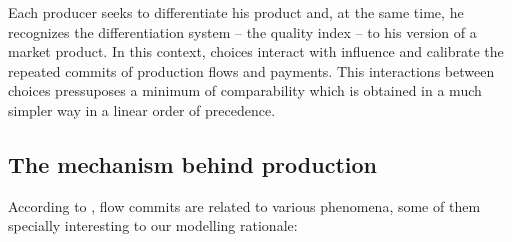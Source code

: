\documentclass[a4paper, 12pt, openright, oneside, german, french, brazil, english, article]{abntex2}
\begin{document}
	
	Each producer seeks to differentiate his product and, at the same time, he recognizes the differentiation system -- the quality index -- to his version of a market product. In this context, choices interact with influence and calibrate the repeated commits of production flows and payments. This interactions between choices pressuposes a minimum of comparability which is obtained in a much simpler way in a linear order of precedence.
	
	\subsection{The mechanism behind production}
	
	
	According to , flow commits are related to various phenomena, some of them specially interesting to our modelling rationale:
	
\end{document}
